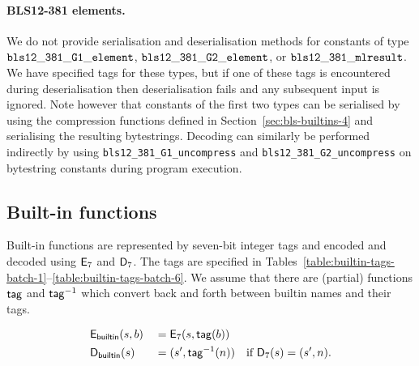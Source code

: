 \paragraph{BLS12-381 elements.}
We do not provide serialisation and deserialisation methods for constants of type
$\mathtt{bls12\_381\_G1\_element}$, $\mathtt{bls12\_381\_G2\_element}$, or
$\mathtt{bls12\_381\_mlresult}$.  We have specified tags for these types, but if one
of these tags is encountered during deserialisation then deserialisation fails
and any subsequent input is ignored.  Note however that constants of the first
two types can be serialised by using the compression functions defined in
Section~\ref{sec:bls-builtins-4} and serialising the resulting bytestrings.
Decoding can similarly be performed indirectly by using
\texttt{bls12\_381\_G1\_uncompress} and \texttt{bls12\_381\_G2\_uncompress} on
bytestring constants during program execution.


\subsection{Built-in functions}
Built-in functions are represented by seven-bit integer tags and encoded and
decoded using $\mathsf{E}_7$ and $\mathsf{D}_7$.  The tags are specified in
Tables~\ref{table:builtin-tags-batch-1}--\ref{table:builtin-tags-batch-6}.  We
assume that there are (partial) functions $\mathsf{tag}$ and $\mathsf{tag}^{-1}$ which convert back
and forth between builtin names and their tags.

\begin{alignat*}{2}
  & \mathsf{E}_{\mathsf{builtin}}(s,b) &&= \mathsf{E}_7(s, \mathsf{tag}(b))\\
  & \mathsf{D}_{\mathsf{builtin}}(s)   &&= (s', \mathsf{tag}^{-1}(n)) \quad \text{if $\mathsf{D}_7(s) = (s', n)$}.\\
\end{alignat*}

